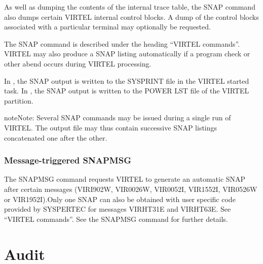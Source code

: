 \documentclass[letterpaper,10pt,english]{sphinxmanual}
\begin{document}
As well as dumping the contents of the internal trace table, the SNAP command also dumps certain VIRTEL internal control blocks. A dump of the control blocks associated with a particular terminal may optionally be requested.

The SNAP command is described under the heading “VIRTEL commands”. VIRTEL may also produce a SNAP listing automatically if a program check or other abend occurs during VIRTEL processing.

In , the SNAP output is written to the SYSPRINT file in the VIRTEL started task.
In , the SNAP output is written to the POWER LST file of the VIRTEL partition.

\begin{sphinxadmonition}{note}{Note:}
Several SNAP commands may be issued during a single run of VIRTEL. The output file may thus contain successive SNAP listings concatenated one after the other.
\end{sphinxadmonition}



\ignorespaces 

\subsection{Message-triggered SNAPMSG}
\label{\detokenize{audit_operations_ and_performance:message-triggered-snapmsg}}\label{\detokenize{audit_operations_ and_performance:index-82}}
The SNAPMSG command requests VIRTEL to generate an automatic SNAP after certain messages (VIRI902W, VIR0026W, VIR0052I, VIR1552I, VIR0526W or VIR1952I).Only one SNAP can also be obtained with user specific code provided by SYSPERTEC for messages VIRHT31E and VIRHT63E. See “VIRTEL commands”. See the SNAPMSG command for further details.

\ignorespaces 

\chapter{Audit}
\label{\detokenize{audit_operations_ and_performance:audit}}\label{\detokenize{audit_operations_ and_performance:index-83}}
\ignorespaces 
\end{document}

